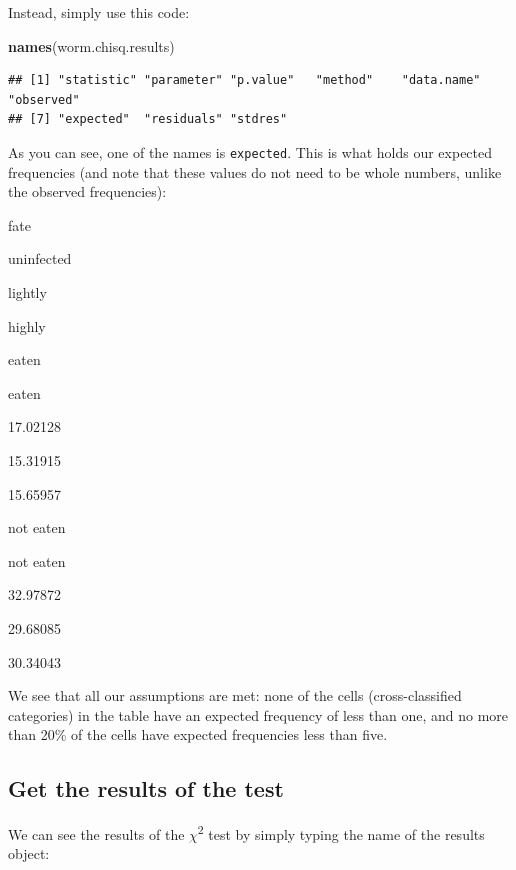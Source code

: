 \documentclass[
]{book}
\newenvironment{Shaded}{\begin{snugshade}}{\end{snugshade}}
\newcommand{\FunctionTok}[1]{\textcolor[rgb]{0.13,0.29,0.53}{\textbf{#1}}}
\newcommand{\NormalTok}[1]{#1}
\newcommand{\SpecialCharTok}[1]{\textcolor[rgb]{0.81,0.36,0.00}{\textbf{#1}}}
\begin{document}
Instead, simply use this code:

\begin{Shaded}
\begin{Highlighting}[]
\FunctionTok{names}\NormalTok{(worm.chisq.results)}
\end{Highlighting}
\end{Shaded}

\begin{verbatim}
## [1] "statistic" "parameter" "p.value"   "method"    "data.name" "observed" 
## [7] "expected"  "residuals" "stdres"
\end{verbatim}

As you can see, one of the names is \texttt{expected}. This is what holds our expected frequencies (and note that these values do not need to be whole numbers, unlike the observed frequencies):

\begin{Shaded}
\end{Shaded}

fate

uninfected

lightly

highly

eaten

eaten

17.02128

15.31915

15.65957

not eaten

not eaten

32.97872

29.68085

30.34043

We see that all our assumptions are met: none of the cells (cross-classified categories) in the table have an expected frequency of less than one, and no more than 20\% of the cells have expected frequencies less than five.

\subsection{Get the results of the test}\label{chiresults}

We can see the results of the \(\chi\)\textsuperscript{2} test by simply typing the name of the results object:
\end{document}
